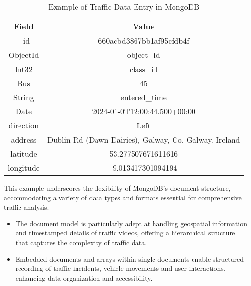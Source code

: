 \begin{table}[h]
\centering
\label{tab:traffic_data}
\begin{tabular}{|c|c|}
\hline
\textbf{Field}          & \textbf{Value}                                       \\ \hline
\_id                    & 660acbd3867bb1af95cfdb4f                             \\ \hline
ObjectId                & object\_id                                           \\ \hline
Int32                   & class\_id                                            \\ \hline
Bus                     & 45                                                   \\ \hline
String                  & entered\_time                                        \\ \hline
Date                    & 2024-01-0T12:00:44.500+00:00                        \\ \hline
direction               & Left                                                 \\ \hline
address                 & Dublin Rd (Dawn Dairies), Galway, Co. Galway, Ireland \\ \hline
latitude                & 53.277507671611616                                   \\ \hline
longitude               & -9.013417301094194                                   \\ \hline
\end{tabular}
\caption{Example of Traffic Data Entry in MongoDB}
\end{table}

This example underscores the flexibility of MongoDB's document structure, accommodating a variety of data types and formats essential for comprehensive traffic analysis.

\begin{itemize}
    \item The document model is particularly adept at handling geospatial information and timestamped details of traffic videos, offering a hierarchical structure that captures the complexity of traffic data.
    \item Embedded documents and arrays within single documents enable structured recording of traffic incidents, vehicle movements and user interactions, enhancing data organization and accessibility.
\end{itemize}

